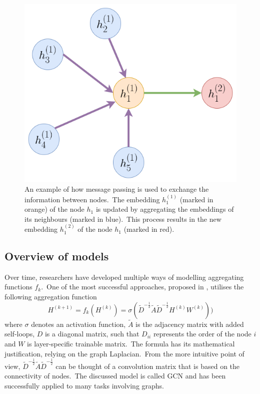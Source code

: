 \documentclass[longabstract, english, mgr]{iithesis}
\theoremstyle{default_theorem_style}\newtheorem{theorem}{Theorem}
\theoremstyle{default_theorem_style}\newtheorem{definition}{Definition}
\begin{document}
\begin{figure}[t]
\centering
\includegraphics[scale=0.4]{graph_network}
\caption{An example of how message passing is used to exchange the information between nodes.\ The embedding
$h_1^{(1)}$ (marked in orange) of the node $h_1$ is updated by aggregating the embeddings of its
neighbours (marked in blue).\ This process results in the new embedding $h_1^{(2)}$ of the node $h_1$ (marked in red).}
\label{fig:graph_network}
\end{figure}

\subsection{Overview of models}

Over time, researchers have developed multiple ways of modelling aggregating functions $f_k$.\ One of the most
successful approaches, proposed in \cite{gcn_model}, utilises the following aggregation function
$$
H^{(k + 1)} = f_k(H^{(k)}) = \sigma(\tilde{D}^{-\frac{1}{2}} \tilde{A} \tilde{D}^{-\frac{1}{2}} H^{(k)} W^{(k)}))
$$
where $\sigma$ denotes an activation function, $\tilde{A}$ is the adjacency matrix with added self-loops, $D$ is
a diagonal matrix, such that $D_{ii}$ represents the order of the node $i$ and $W$ is layer-specific trainable
matrix.\ The formula has its mathematical justification, relying on the graph Laplacian.\ From the more intuitive
point of view, $\tilde{D}^{-\frac{1}{2}} \tilde{A} \tilde{D}^{-\frac{1}{2}}$ can be thought of a convolution matrix
that is based on the connectivity of nodes.\ The discussed model is called GCN and has been successfully applied
to many tasks involving graphs.\newline
\end{document}
